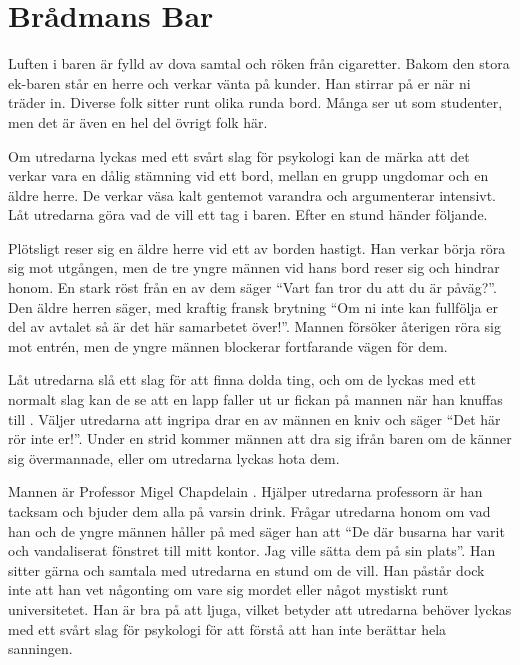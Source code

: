 \section{Brådmans Bar}
\label{loc:BradmansBar}
%
\begin{displayquote}
	Luften i baren är fylld av dova samtal och röken från cigaretter. Bakom den stora ek-baren står en herre och verkar vänta på kunder. Han stirrar på er när ni träder in. Diverse folk sitter runt olika runda bord. Många ser ut som studenter, men det är även en hel del övrigt folk här.
\end{displayquote}
%
Om utredarna lyckas med ett svårt slag för psykologi kan de märka att det verkar vara en dålig stämning vid ett bord, mellan en grupp ungdomar och en äldre herre. De verkar väsa kalt gentemot varandra och argumenterar intensivt. Låt utredarna göra vad de vill ett tag i baren. Efter en stund händer följande.

\begin{displayquote}
	Plötsligt reser sig en äldre herre vid ett av borden hastigt. Han verkar börja röra sig mot utgången, men de tre yngre männen vid hans bord reser sig och hindrar honom. En stark röst från en av dem säger ``Vart fan tror du att du är påväg?''. Den äldre herren säger, med kraftig fransk brytning ``Om ni inte kan fullfölja er del av avtalet så är det här samarbetet över!''. Mannen försöker återigen röra sig mot entrén, men de yngre männen blockerar fortfarande vägen för dem.
\end{displayquote}
%
Låt utredarna slå ett slag för att finna dolda ting, och om de lyckas med ett normalt slag kan de se att en lapp faller ut ur fickan på mannen när han knuffas till \sectiondescribe{\ref{uppd:TaSigTillG}}.
Väljer utredarna att ingripa drar en av männen en kniv och säger ``Det här rör inte er!''. Under en strid kommer männen att dra sig ifrån baren om de känner sig övermannade, eller om utredarna lyckas hota dem. 

Mannen är Professor Migel Chapdelain \sectiondescribe{\ref{kar:MigelChapdelain}}. Hjälper utredarna professorn är han tacksam och bjuder dem alla på varsin drink. Frågar utredarna honom om vad han och de yngre männen håller på med säger han att ``De där busarna har varit och vandaliserat fönstret till mitt kontor. Jag ville sätta dem på sin plats''. Han sitter gärna och samtala med utredarna en stund om de vill. Han påstår dock inte att han vet någonting om vare sig mordet eller något mystiskt runt universitetet. Han är bra på att ljuga, vilket betyder att utredarna behöver lyckas med ett svårt slag för psykologi för att förstå att han inte berättar hela sanningen.

